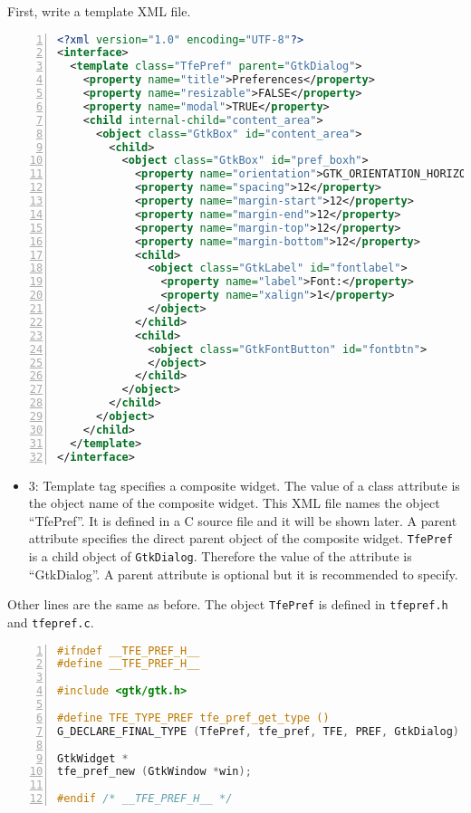 First, write a template XML file.

\begin{lstlisting}[language=XML, numbers=left]
<?xml version="1.0" encoding="UTF-8"?>
<interface>
  <template class="TfePref" parent="GtkDialog">
    <property name="title">Preferences</property>
    <property name="resizable">FALSE</property>
    <property name="modal">TRUE</property>
    <child internal-child="content_area">
      <object class="GtkBox" id="content_area">
        <child>
          <object class="GtkBox" id="pref_boxh">
            <property name="orientation">GTK_ORIENTATION_HORIZONTAL</property>
            <property name="spacing">12</property>
            <property name="margin-start">12</property>
            <property name="margin-end">12</property>
            <property name="margin-top">12</property>
            <property name="margin-bottom">12</property>
            <child>
              <object class="GtkLabel" id="fontlabel">
                <property name="label">Font:</property>
                <property name="xalign">1</property>
              </object>
            </child>
            <child>
              <object class="GtkFontButton" id="fontbtn">
              </object>
            </child>
          </object>
        </child>
      </object>
    </child>
  </template>
</interface>
\end{lstlisting}

\begin{itemize}
\tightlist
\item
  3: Template tag specifies a composite widget. The value of a class
  attribute is the object name of the composite widget. This XML file
  names the object ``TfePref''. It is defined in a C source file and it
  will be shown later. A parent attribute specifies the direct parent
  object of the composite widget. \passthrough{\lstinline!TfePref!} is a
  child object of \passthrough{\lstinline!GtkDialog!}. Therefore the
  value of the attribute is ``GtkDialog''. A parent attribute is
  optional but it is recommended to specify.
\end{itemize}

Other lines are the same as before. The object
\passthrough{\lstinline!TfePref!} is defined in
\passthrough{\lstinline!tfepref.h!} and
\passthrough{\lstinline!tfepref.c!}.

\begin{lstlisting}[language=C, numbers=left]
#ifndef __TFE_PREF_H__
#define __TFE_PREF_H__

#include <gtk/gtk.h>

#define TFE_TYPE_PREF tfe_pref_get_type ()
G_DECLARE_FINAL_TYPE (TfePref, tfe_pref, TFE, PREF, GtkDialog)

GtkWidget *
tfe_pref_new (GtkWindow *win);

#endif /* __TFE_PREF_H__ */
\end{lstlisting}

